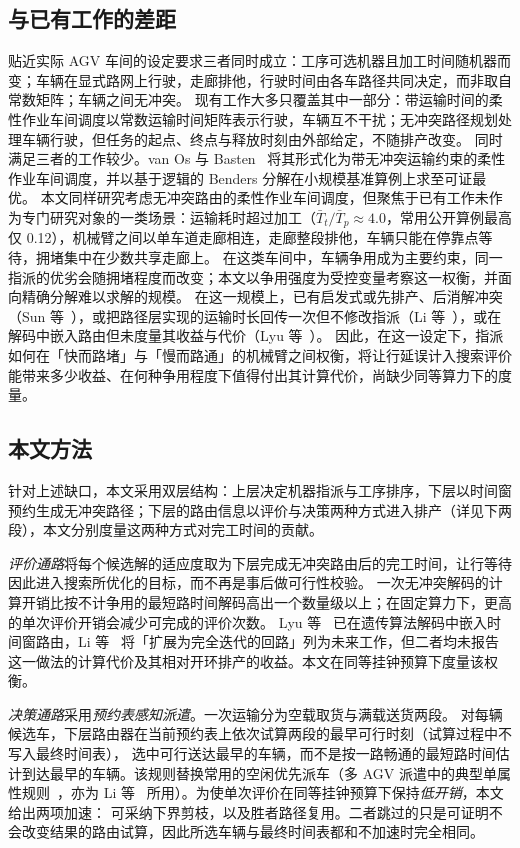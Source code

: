 \documentclass[manuscript,screen,review]{acmart}
\newcommand{\PubTtTpHi}{0.12}            %
\begin{document}
\subsection{与已有工作的差距}

贴近实际 AGV 车间的设定要求三者同时成立：工序可选机器且加工时间随机器而变；车辆在显式路网上行驶，走廊排他，行驶时间由各车路径共同决定，而非取自常数矩阵；车辆之间无冲突。
现有工作大多只覆盖其中一部分：带运输时间的柔性作业车间调度以常数运输时间矩阵表示行驶，车辆互不干扰；无冲突路径规划处理车辆行驶，但任务的起点、终点与释放时刻由外部给定，不随排产改变。
同时满足三者的工作较少。van Os 与 Basten~\cite{vanos2026exact} 将其形式化为带无冲突运输约束的柔性作业车间调度，并以基于逻辑的 Benders 分解在小规模基准算例上求至可证最优。
本文同样研究考虑无冲突路由的柔性作业车间调度，但聚焦于已有工作未作为专门研究对象的一类场景：运输耗时超过加工（$\bar{T}_t/\bar{T}_p\approx4.0$，常用公开算例最高仅 \PubTtTpHi{}），机械臂之间以单车道走廊相连，走廊整段排他，车辆只能在停靠点等待，拥堵集中在少数共享走廊上。
在这类车间中，车辆争用成为主要约束，同一指派的优劣会随拥堵程度而改变；本文以争用强度为受控变量考察这一权衡，并面向精确分解难以求解的规模。
在这一规模上，已有启发式或先排产、后消解冲突（Sun 等~\cite{sun2023integrated}），或把路径层实现的运输时长回传一次但不修改指派（Li 等~\cite{li2026framework}），或在解码中嵌入路由但未度量其收益与代价（Lyu 等~\cite{lyu2019approach}）。
因此，在这一设定下，指派如何在「快而路堵」与「慢而路通」的机械臂之间权衡，将让行延误计入搜索评价能带来多少收益、在何种争用程度下值得付出其计算代价，尚缺少同等算力下的度量。

\subsection{本文方法}

针对上述缺口，本文采用双层结构：上层决定机器指派与工序排序，下层以时间窗预约生成无冲突路径；下层的路由信息以评价与决策两种方式进入排产（详见下两段），本文分别度量这两种方式对完工时间的贡献。

\emph{评价通路}将每个候选解的适应度取为下层完成无冲突路由后的完工时间，让行等待因此进入搜索所优化的目标，而不再是事后做可行性校验。
一次无冲突解码的计算开销比按不计争用的最短路时间解码高出一个数量级以上；在固定算力下，更高的单次评价开销会减少可完成的评价次数。
Lyu 等~\cite{lyu2019approach} 已在遗传算法解码中嵌入时间窗路由，Li 等~\cite{li2026framework} 将「扩展为完全迭代的回路」列为未来工作，但二者均未报告这一做法的计算代价及其相对开环排产的收益。本文在同等挂钟预算下度量该权衡。

\emph{决策通路}采用\emph{预约表感知派遣}。一次运输分为空载取货与满载送货两段。
对每辆候选车，下层路由器在当前预约表上依次试算两段的最早可行时刻（试算过程中不写入最终时间表），
选中可行送达最早的车辆，而不是按一路畅通的最短路时间估计到达最早的车辆。该规则替换常用的空闲优先派车（多 AGV 派遣中的典型单属性规则~\cite{lu2022agv}，亦为 Li 等~\cite{li2026framework} 所用）。为使单次评价在同等挂钟预算下保持\emph{低开销}，本文给出两项加速：
可采纳下界剪枝，以及胜者路径复用。二者跳过的只是可证明不会改变结果的路由试算，因此所选车辆与最终时间表都和不加速时完全相同。
\end{document}
